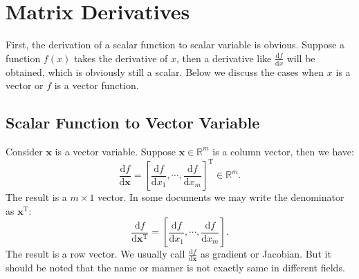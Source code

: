 \chapter{Matrix Derivatives}
\label{cpt:app-B}
First, the derivation of a scalar function to scalar variable is obvious. Suppose a function $f(x)$ takes the derivative of $x$, then a derivative like $\frac{\mathrm{d}f}{\mathrm{d}x}$ will be obtained, which is obviously still a scalar. Below we discuss the cases when $x$ is a vector or $f$ is a vector function.

\section{Scalar Function to Vector Variable}
Consider $\bm{x}$ is a vector variable. Suppose $\bm{x} \in \mathbb{R}^m$ is a column vector, then we have:
\begin{equation}
	\frac{{\mathrm{d}f}}{{\mathrm{d}\bm{x}}} = {\left[ {\frac{{\mathrm{d}f}}{{\mathrm{d}{x_1}}}, \cdots ,\frac{{\mathrm{d}f}}{{\mathrm{d}{x_m}}}} \right]^\mathrm{T}} \in {\mathbb{R}^m}.
\end{equation}
The result is a $m \times 1$ vector. In some documents we may write the denominator as $\bm{x}^\mathrm{T}$:
\begin{equation}
	\frac{{\mathrm{d}f}}{{\mathrm{d}\bm{x}^\mathrm{T}}} =  {\left[ {\frac{{\mathrm{d}f}}{{\mathrm{d}{x_1}}}, \cdots ,\frac{{\mathrm{d}f}}{{\mathrm{d}{x_m}}}} \right]}.
\end{equation}
The result is a row vector. We usually call $\frac{\mathrm{d}f}{\mathrm{d}\bm{x}}$ as gradient or Jacobian. But it should be noted that the name or manner is not exactly same in different fields.

